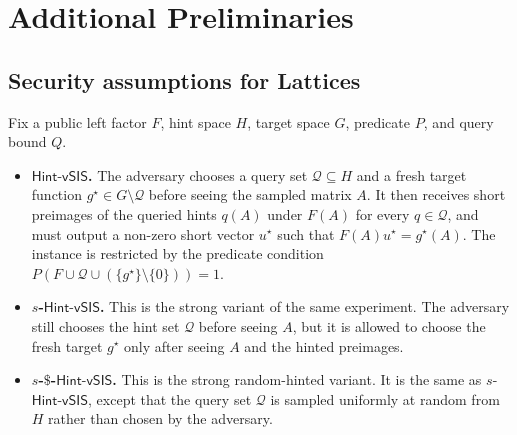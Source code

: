 \section{Additional Preliminaries}
\label{app:defs}

\subsection{Security assumptions for Lattices}\label{app:assumptions lattices}

Fix a public left factor \(F\), hint space \(H\), target space \(G\), predicate \(P\), and query bound \(Q\).
\begin{itemize}[leftmargin=1.25em]
  \item \textbf{\(\mathsf{Hint\mbox{-}vSIS}\).} The adversary chooses a query set \(\mathcal{Q}\subseteq H\) and a fresh
  target function \(g^\star\in G\setminus \mathcal{Q}\) before seeing the sampled matrix \(A\). It then receives short
  preimages of the queried hints \(q(A)\) under \(F(A)\) for every \(q\in\mathcal{Q}\), and must output a non-zero short
  vector \(u^\star\) such that \(F(A)u^\star=g^\star(A)\). The instance is restricted by the predicate condition
  \(P(F\cup \mathcal{Q}\cup(\{g^\star\}\setminus\{0\}))=1\).
  \item \textbf{\(s\)-\(\mathsf{Hint\mbox{-}vSIS}\).} This is the strong variant of the same experiment. The adversary still
  chooses the hint set \(\mathcal{Q}\) before seeing \(A\), but it is allowed to choose the fresh target \(g^\star\) only
  after seeing \(A\) and the hinted preimages.
  \item \textbf{\(s\)-\(\$\)-\(\mathsf{Hint\mbox{-}vSIS}\).} This is the strong random-hinted variant. It is the same as
  \(s\)-\(\mathsf{Hint\mbox{-}vSIS}\), except that the query set \(\mathcal{Q}\) is sampled uniformly at random from \(H\)
  rather than chosen by the adversary.
\end{itemize}


